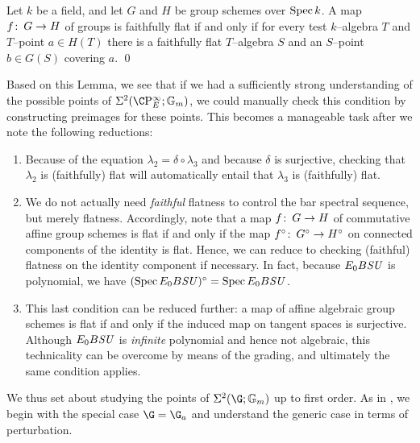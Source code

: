\begin{lemma}
Let \(k\) be a field, and let \(G\) and \(H\) be group schemes over \(\operatorname{Spec} k\).
A map \(f\colon\thinspace G \to H\) of groups is faithfully flat if and only if for every test \(k\)--algebra \(T\) and \(T\)--point \(a \in H(T)\) there is a faithfully flat \(T\)--algebra \(S\) and an \(S\)--point \(b \in G(S)\) covering \(a\). \qed
\end{lemma}

\noindent Based on this Lemma, we see that if we had a sufficiently strong understanding of the possible points of \(\Sigma^2(\CP^\infty_E; \Gm)\), we could manually check this condition by constructing preimages for these points.
This becomes a manageable task after we note the following reductions:
\begin{enumerate}
    \item Because of the equation \(\lambda_2 = \delta \circ \lambda_3\) and because \(\delta\) is surjective, checking that \(\lambda_2\) is (faithfully) flat will automatically entail that \(\lambda_3\) is (faithfully) flat.
    \item We do not actually need \emph{faithful} flatness to control the bar spectral sequence, but merely flatness.
          Accordingly, note that a map \(f\colon\thinspace G \to H\) of commutative affine group schemes is flat if and only if the map \(f^\circ\colon\thinspace G^\circ \to H^\circ\) on connected components of the identity is flat.
          Hence, we can reduce to checking (faithful) flatness on the identity component if necessary.
          In fact, because \(E_0 B\mathit{SU}\) is polynomial, we have \((\operatorname{Spec} E_0 B\mathit{SU})^\circ = \operatorname{Spec} E_0 B\mathit{SU}\).
    \item This last condition can be reduced further: a map of affine algebraic group schemes is flat if and only if the induced map on tangent spaces is surjective.
          Although \(E_0 B\mathit{SU}\) is \emph{infinite} polynomial and hence not algebraic, this technicality can be overcome by means of the grading, and ultimately the same condition applies.
\end{enumerate}

We thus set about studying the points of \(\Sigma^2(\G; \Gm)\) up to first order.
As in , we begin with the special case \(\G = \G_a\) and understand the generic case in terms of perturbation.

